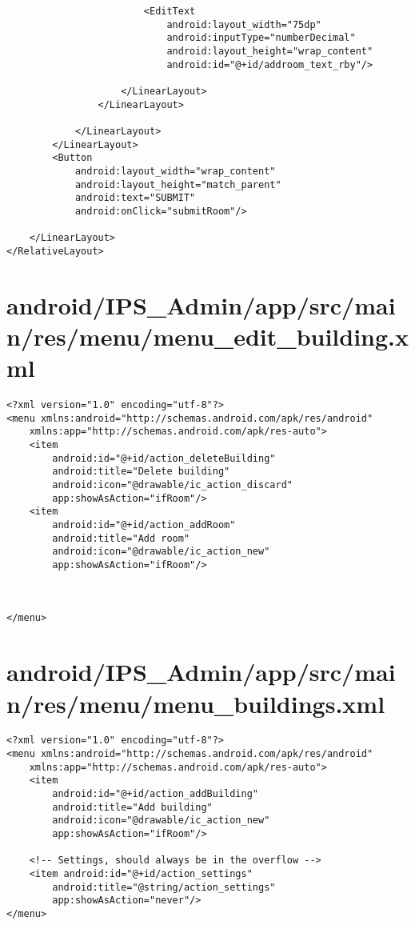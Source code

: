 \begin{lstlisting}
                        <EditText
                            android:layout_width="75dp"
                            android:inputType="numberDecimal"
                            android:layout_height="wrap_content"
                            android:id="@+id/addroom_text_rby"/>

                    </LinearLayout>
                </LinearLayout>

            </LinearLayout>
        </LinearLayout>
        <Button
            android:layout_width="wrap_content"
            android:layout_height="match_parent"
            android:text="SUBMIT"
            android:onClick="submitRoom"/>

    </LinearLayout>
</RelativeLayout>
\end{lstlisting}
\newpage
\section{android/IPS\_Admin/app/src/main/res/menu/menu_edit_building.xml}
\begin{lstlisting}<?xml version="1.0" encoding="utf-8"?>
<menu xmlns:android="http://schemas.android.com/apk/res/android"
    xmlns:app="http://schemas.android.com/apk/res-auto">
    <item
        android:id="@+id/action_deleteBuilding"
        android:title="Delete building"
        android:icon="@drawable/ic_action_discard"
        app:showAsAction="ifRoom"/>
    <item
        android:id="@+id/action_addRoom"
        android:title="Add room"
        android:icon="@drawable/ic_action_new"
        app:showAsAction="ifRoom"/>



</menu>
\end{lstlisting}
\newpage
\section{android/IPS\_Admin/app/src/main/res/menu/menu_buildings.xml}
\begin{lstlisting}<?xml version="1.0" encoding="utf-8"?>
<menu xmlns:android="http://schemas.android.com/apk/res/android"
    xmlns:app="http://schemas.android.com/apk/res-auto">
    <item
        android:id="@+id/action_addBuilding"
        android:title="Add building"
        android:icon="@drawable/ic_action_new"
        app:showAsAction="ifRoom"/>

    <!-- Settings, should always be in the overflow -->
    <item android:id="@+id/action_settings"
        android:title="@string/action_settings"
        app:showAsAction="never"/>
</menu>
\end{lstlisting}
\newpage

